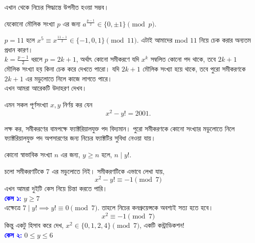 \documentclass[11pt]{report}
\begin{document}
এখান থেকে নিচের সিদ্ধান্তে উপনীত হওয়া সম্ভব।\\

\begin{tcolorbox}[colframe=blue!80!blue]

যেকোনো মৌলিক সংখ্যা $p$ এর জন্য $a^{\frac{p-1}{2}} \in \{0, \pm 1\} \pmod{p}.$

\end{tcolorbox}

$p=11$ হলে $x^5 \equiv x^{\frac{11-1}{2}} \in \{-1, 0, 1\} \pmod{11}$. এটাই আমাদের mod $11$ নিয়ে চেক করার অন্যতম প্রধান কারণ।\\

$k=\frac{p-1}{2}$ ধরলে $p=2k+1$, অর্থাৎ কোনো সমীকরণে যদি $x^k$ সম্বলিত কোনো পদ থাকে, তবে $2k+1$ মৌলিক সংখ্যা হয় কিনা চেক করে দেখতে পারো। যদি $2k+1$ মৌলিক সংখ্যা হয়ে থাকে, তবে পুরো সমীকরণকে $2k+1$ এর মডুলোতে নিলে কাজে লাগতে পারে।\\

এখন আমরা আরেকটি উদাহরণ দেখব।\\

\begin{tcolorbox}[colframe=black!80!green,title=উদাহরণ 2.1.2]
এমন সকল পূর্ণসংখ্যা $x, y$ নির্ণয় কর যেন $$x^2 - y! = 2001.$$
\end{tcolorbox}

লক্ষ কর, সমীকরণের বামপক্ষে ফ্যাক্টরিয়ালযুক্ত পদ বিদ্যমান। পুরো সমীকরণকে কোনো সংখ্যার মডুলোতে নিলে ফ্যাক্টরিয়ালযুক্ত পদ অপসারণের জন্য নিচের ফ্যাক্টটির সুবিধা নেওয়া যায়।\\

\begin{tcolorbox}[colframe=blue!80!blue]

কোনো স্বাভাবিক সংখ্যা $n$ এর জন্য, $y \geq n$ হলে, $n \mid y!.$

\end{tcolorbox}

চলো সমীকরণটিকে $7$ এর মডুলোতে নিই। সমীকরণটিকে এভাবে লেখা যায়, $$x^2 - y! \equiv -1 \pmod{7}$$ এখন আমরা দুইটি কেস নিয়ে চিন্তা করতে পারি।\\

\textbf{\textcolor{blue}{কেস ১:}} $y \geq 7$\\

এক্ষেত্রে $7 \mid y! \implies y! \equiv 0 \pmod{7}.$ তাহলে নিচের কনগ্রুয়েন্সকে অবশ্যই সত্য হতে হবে। $$x^2 \equiv -1 \pmod{7}$$ কিন্তু একটু হিসাব করে দেখ, $x^2 \in \{0,1,2,4\} \pmod{7}$, একটি কন্ট্রাডিকশন!\\

\textbf{\textcolor{blue}{কেস ২:}} $0 \leq y \leq 6$\\
\end{document}
